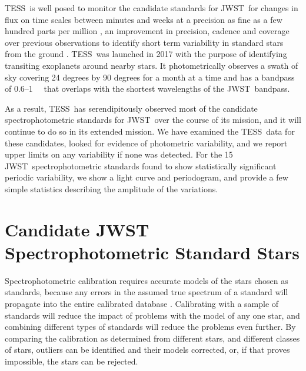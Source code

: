 \documentclass[twocolumn]{aastex631}
\newcommand{\webb}{JWST}
\newcommand{\jwst}{JWST}
\newcommand{\tess}{TESS}
\newcommand{\mum}{\ifmmode{\rm \mu m}\else{$\mu$m}\fi}
\begin{document}
\tess\ is well posed to monitor the candidate standards for \webb\ for changes in flux on time scales between minutes and weeks at a precision as fine as a few hundred parts per million \citep{Ricker2015}, an improvement in precision, cadence and coverage over previous observations to identify short term variability in standard stars from the ground \citep[e.g.][]{Marinoni2016}.  \tess\ was launched in 2017 with the purpose of identifying transiting exoplanets around nearby stars.  It photometrically observes a swath of sky covering 24 degrees by 90 degrees for a month at a time and has a bandpass of 0.6--1~\mum\ \citep{Ricker2015} that overlaps with the shortest wavelengths of the \webb\ bandpass.

As a result, \tess\ has serendipitously observed most of the candidate spectrophotometric standards for \webb\ over the course of its mission, and it will continue to do so in its extended mission.  We have examined the \tess\ data for these candidates, looked for evidence of photometric variability, and we report upper limits on any variability if none was detected.  For the 15 \jwst\ spectrophotometric standards found to show statistically significant periodic variability, we show a light curve and periodogram, and provide a few simple statistics describing the amplitude of the variations. 



\section{Candidate JWST Spectrophotometric Standard Stars} 
\label{sec:targets}

Spectrophotometric calibration requires accurate models of the stars chosen as standards, because any errors in the assumed true spectrum of a standard will propagate into the entire calibrated database \citep{Gordon2022inprep}.  Calibrating with a sample of standards will reduce the impact of problems with the model of any one star, and combining different types of standards will reduce the problems even further.  By comparing the calibration as determined from different stars, and different classes of stars, outliers can be identified and their models corrected, or, if that proves impossible, the stars can be rejected.
\end{document}
